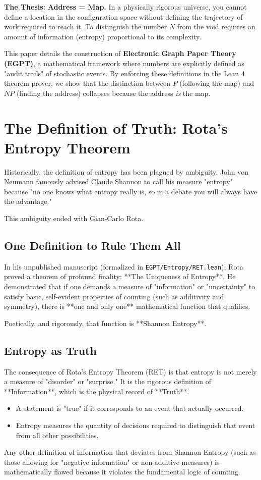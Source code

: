 \documentclass{report}
\begin{document}
\textbf{The Thesis:} \textbf{Address = Map.} In a physically rigorous universe, you cannot define a location in the configuration space without defining the trajectory of work required to reach it. To distinguish the number $N$ from the void requires an amount of information (entropy) proportional to its complexity.

This paper details the construction of \textbf{Electronic Graph Paper Theory (EGPT)}, a mathematical framework where numbers are explicitly defined as "audit trails" of stochastic events. By enforcing these definitions in the Lean 4 theorem prover, we show that the distinction between $P$ (following the map) and $NP$ (finding the address) collapses because the address \textit{is} the map.

\section{The Definition of Truth: Rota's Entropy Theorem}

Historically, the definition of entropy has been plagued by ambiguity. John von Neumann famously advised Claude Shannon to call his measure "entropy" because "no one knows what entropy really is, so in a debate you will always have the advantage."

This ambiguity ended with Gian-Carlo Rota.

\subsection{One Definition to Rule Them All}
In his unpublished manuscript (formalized in \texttt{EGPT/Entropy/RET.lean}), Rota proved a theorem of profound finality: **The Uniqueness of Entropy**. He demonstrated that if one demands a measure of "information" or "uncertainty" to satisfy basic, self-evident properties of counting (such as additivity and symmetry), there is **one and only one** mathematical function that qualifies.

Poetically, and rigorously, that function is **Shannon Entropy**.

\subsection{Entropy as Truth}
The consequence of Rota's Entropy Theorem (RET) is that entropy is not merely a measure of "disorder" or "surprise." It is the rigorous definition of **Information**, which is the physical record of **Truth**.
\begin{itemize}
    \item A statement is "true" if it corresponds to an event that actually occurred.
    \item Entropy measures the quantity of decisions required to distinguish that event from all other possibilities.
\end{itemize}
Any other definition of information that deviates from Shannon Entropy (such as those allowing for "negative information" or non-additive measures) is mathematically flawed because it violates the fundamental logic of counting.
\end{document}
